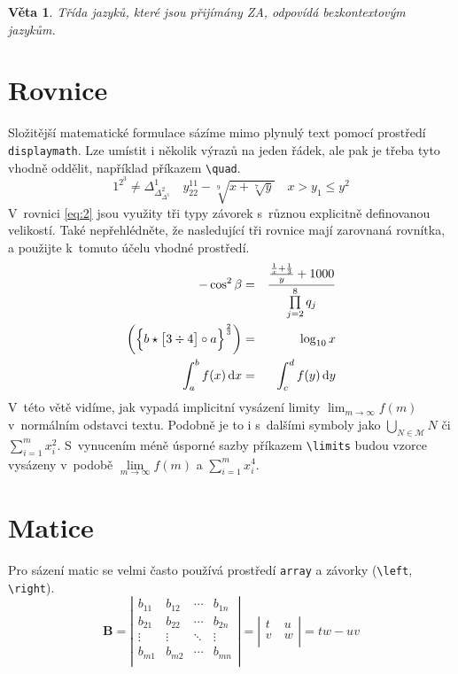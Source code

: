 \documentclass[a4paper, 11pt, twocolumn]{article}
\newtheorem{sentence}{Věta}
\begin{document}
\begin{sentence} 
    Třída jazyků, které jsou přijímány ZA, odpovídá \textup{bezkontextovým jazykům.}
\end{sentence}

\section{Rovnice}
\label{sec:2}
Složitější matematické formulace sázíme mimo plynulý text pomocí prostředí \verb|displaymath|. Lze umístit i několik výrazů na jeden řádek, ale pak je třeba tyto vhodně oddělit, například příkazem \verb|\quad|.
\begin{displaymath}
    1^{2^{3}} \neq \Delta^{1}_{\Delta^{2}_{\Delta^3}} \quad
    y^{11}_{22} - \sqrt[9]{x + \sqrt[7]{y}} \quad
    x > y_1 \leq y^2
\end{displaymath}
V~rovnici \eqref{eq:2} jsou využity tři typy závorek s~různou explicitně definovanou velikostí. 
Také nepřehlédněte, že nasledující tři rovnice mají zarovnaná rovnítka, a použijte k~tomuto účelu vhodné prostředí.
\begin{eqnarray}
    - \cos^2 \beta & = & \frac{\frac{\frac{1}{x} + \frac{1}{3}}{y} + 1000}{\prod\limits _{j=2}^8 q_j} \label{eq:1}\\
    \left( \Bigl\{ b \star \bigl[3 \div 4\bigr] \circ a \Bigr\}^{\frac{2}{3}}\right) & = & \log_{10} x \label{eq:2}\\
    \int_{a}^{b} f(x)\,\mathrm{d}x & = & \int_{c}^{d} f(y)\,\mathrm{d}y \label{eq:3}
\end{eqnarray} 
V~této větě vidíme, jak vypadá implicitní vysázení limity ${\lim_{m\to \infty} f(m)}$ v~normálním odstavci textu. 
Podobně je to i s~dalšími symboly jako ${\bigcup_{N \in \mathcal{M}}N}$ či ${\sum_{i=1}^{m} x_{i}^2}$.
S~vynucením méně úsporné sazby příkazem \verb|\limits| budou vzorce vysázeny v~podobě ${\lim\limits _{m \to \infty} f(m)}$ a ${\sum\limits _{i=1}^{m} x_{i}^4}$.

\section{Matice}
\label{sec:3}
Pro sázení matic se velmi často používá prostředí \verb|array| a závorky (\verb|\left|, \verb|\right|). 
\[ \mathbf{B} = \left| \begin{array}{cccc}
        b_{11} & b_{12} & \cdots & b_{1n}\\
        b_{21} & b_{22} & \cdots & b_{2n}\\
        \vdots & \vdots & \ddots & \vdots\\
        b_{m1} & b_{m2} & \cdots & b_{mn}\\
        \end{array} \right|
        = \left| \begin{array}{cc}
        t & u\\
        v~& w\\ 
        \end{array} \right|
        = tw - uv
\]
\end{document}
